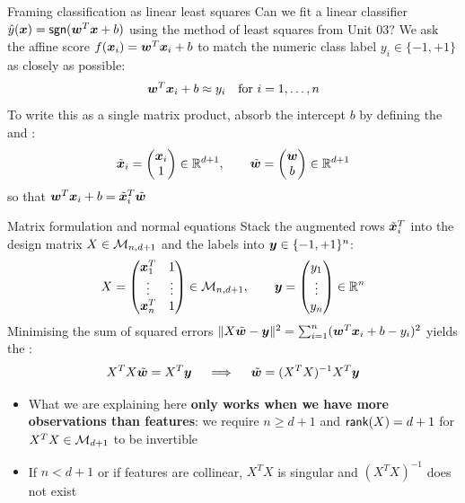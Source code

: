 \documentclass[aspectratio=169]{beamer}\usepackage[]{graphicx}\usepackage[]{xcolor}
\begin{document}

\begin{frame}{Framing classification as linear least squares}
    Can we fit a linear classifier $\hat{y}(\bm{x}) = \mathsf{sgn}(\bm{w}^T \bm{x} + b)$ using the method of least squares from Unit 03?
    \vfill
    We ask the affine score $f(\bm{x}_i) = \bm{w}^T \bm{x}_i + b$ to match the numeric class label $y_i \in \{-1, +1\}$ as closely as possible:
    \[
        \bm{w}^T \bm{x}_i + b \approx y_i \quad \text{for } i = 1, \ldots, n
    \]
    \vfill
    To write this as a single matrix product, absorb the intercept $b$ by defining the  and :
    \[
        \tilde{\bm{x}}_i = \begin{pmatrix} \bm{x}_i \\ 1 \end{pmatrix} \in \mathbb{R}^{d+1}, \qquad \tilde{\bm{w}} = \begin{pmatrix} \bm{w} \\ b \end{pmatrix} \in \mathbb{R}^{d+1}
    \]
    so that $\bm{w}^T \bm{x}_i + b = \tilde{\bm{x}}_i^T \tilde{\bm{w}}$
\end{frame}


\begin{frame}{Matrix formulation and normal equations}
    Stack the augmented rows $\tilde{\bm{x}}_i^T$ into the design matrix $X \in \mathcal{M}_{n, d+1}$ and the labels into $\bm{y} \in \{-1, +1\}^n$:
    \[
        X = \begin{pmatrix} \bm{x}_1^T & 1 \\ \vdots & \vdots \\ \bm{x}_n^T & 1 \end{pmatrix} \in \mathcal{M}_{n, d+1}, \qquad
        \bm{y} = \begin{pmatrix} y_1 \\ \vdots \\ y_n \end{pmatrix} \in \mathbb{R}^n
    \]
    \vfill
    Minimising the sum of squared errors $\|X\tilde{\bm{w}} - \bm{y}\|^2 = \sum_{i=1}^n (\bm{w}^T \bm{x}_i + b - y_i)^2$ yields the :
    \[
        X^T X \tilde{\bm{w}} = X^T \bm{y} \quad \implies \quad \tilde{\bm{w}} = (X^T X)^{-1} X^T \bm{y}
    \]
    \vfill
    \begin{itemize}
        \item What we are explaining here \textbf{only works when we have more observations than features}: we require $n \ge d + 1$ and $\mathsf{rank}(X) = d + 1$ for $X^T X \in \mathcal{M}_{d+1}$ to be invertible
        \vfill
        \item If $n < d + 1$ or if features are collinear, $X^T X$ is singular and $(X^T X)^{-1}$ does not exist
    \end{itemize}
\end{frame}
\end{document}

